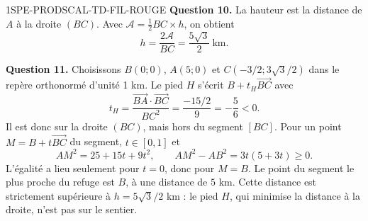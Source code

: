 \begin{corrige}{1SPE-PRODSCAL-TD-FIL-ROUGE}
\textbf{Question 10.}
La hauteur est la distance de $A$ à la droite $(BC)$.
Avec $\mathcal A=\frac12 BC\times h$, on obtient
\[
h=\frac{2\mathcal A}{BC}=\frac{5\sqrt3}{2}\ \text{km}.
\]

\textbf{Question 11.}
Choisissons $B(0;0)$, $A(5;0)$ et
$C(-3/2;3\sqrt3/2)$ dans le repère orthonormé d'unité 1 km.
Le pied $H$ s'écrit $B+t_H\overrightarrow{BC}$ avec
\[
t_H=\frac{\overrightarrow{BA}\cdot\overrightarrow{BC}}{BC^2}
=\frac{-15/2}{9}=-\frac{5}{6}<0.
\]
Il est donc sur la droite $(BC)$, mais hors du segment $[BC]$.
Pour un point $M=B+t\overrightarrow{BC}$ du segment, $t\in[0,1]$ et
\[
AM^2=25+15t+9t^2,\qquad AM^2-AB^2=3t(5+3t)\geq0.
\]
L'égalité a lieu seulement pour $t=0$, donc pour $M=B$.
Le point du segment le plus proche du refuge est $B$, à une distance de $5$ km.
Cette distance est strictement supérieure à $h=5\sqrt3/2$ km :
le pied $H$, qui minimise la distance à la droite, n'est pas sur le sentier.
\end{corrige}
\fi
